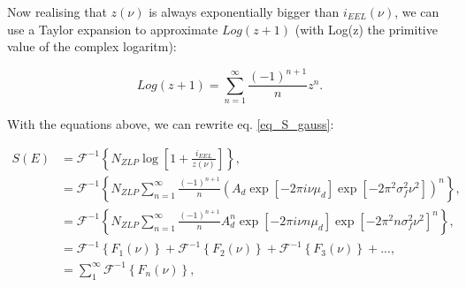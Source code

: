 Now realising that $z(\nu)$ is always exponentially bigger than $i_{EEL}(\nu)$, we can use a Taylor expansion to approximate $Log(z+1)$ (with Log(z) the primitive value of the complex logaritm):

\begin{equation}
Log(z+1) = \sum_{n=1}^\infty \frac{(-1)^{n+1}}{n} z^n.
\end{equation}


With the equations above, we can rewrite eq. \eqref{eq_S_gauss}:

\begin{equation}\label{eq_S_gauss_verder}
\begin{aligned}
S(E) &= \mathcal{F}^{-1}\left\{N_{ZLP}\operatorname{log}\left[1+ \frac{i_{EEL}}{z(\nu)}\right]\right\},\\
&= \mathcal{F}^{-1}\left\{ N_{ZLP} \sum_{n=1}^\infty \frac{(-1)^{n+1}}{n} \left(A_d \exp{[-2\pi i \nu \mu_d]} \exp{\left[ -2\pi^2 \sigma_f^2 \nu^2 \right]}\right)^n  \right\},\\
&= \mathcal{F}^{-1}\left\{ N_{ZLP} \sum_{n=1}^\infty \frac{(-1)^{n+1}}{n} A_d^n \exp{[-2\pi i \nu n \mu_d]} \exp{\left[ -2\pi^2 n \sigma_f^2 \nu^2 \right]}^n  \right\},\\
&= \mathcal{F}^{-1}\left\{ F_1(\nu) \right\} + \mathcal{F}^{-1}\left\{ F_2(\nu) \right\} + \mathcal{F}^{-1}\left\{ F_3(\nu) \right\} + ... , \\
&= \sum_1^{\infty} \mathcal{F}^{-1}\left\{ F_n(\nu) \right\} ,
\end{aligned}
\end{equation}




